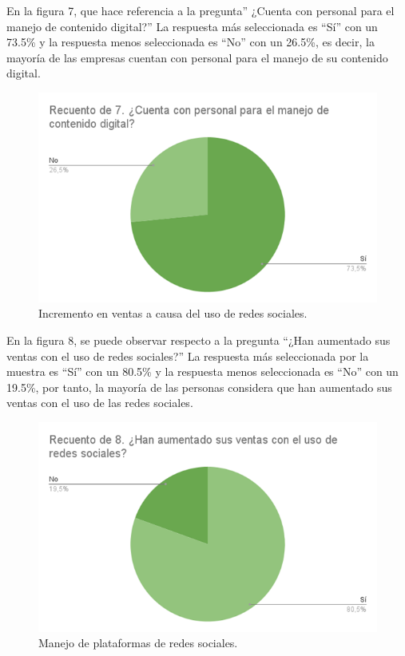 \documentclass[12pt]{difu100cia} %
\begin{document}
	
En la figura 7, que hace referencia a la pregunta” ¿Cuenta con personal para el manejo de contenido digital?” La respuesta más seleccionada es “Sí” con un 73.5\% y la respuesta menos seleccionada es “No” con un 26.5\%, es decir, la mayoría de las empresas cuentan con personal para el manejo de su contenido digital.


\begin{figure}[!htb]
	\centering
	\includegraphics[width=\linewidth]{Figura 8.png}
	\caption{Incremento en ventas a causa del uso de redes sociales.}
	\label{Figur 8}
\end{figure}


En la figura 8, se puede observar respecto a la pregunta “¿Han aumentado sus ventas con el uso de redes sociales?” La respuesta más seleccionada por la muestra es “Sí” con un 80.5\% y la respuesta menos seleccionada es “No” con un 19.5\%, por tanto, la mayoría de las personas considera que han aumentado sus ventas con el uso de las redes sociales.

\begin{figure}[!htb]
	\centering
	\includegraphics[width=\linewidth]{Figura 9.png}
	\caption{Manejo de plataformas de redes sociales.}
	\label{Figur 9}
\end{figure}
	
\end{document}
